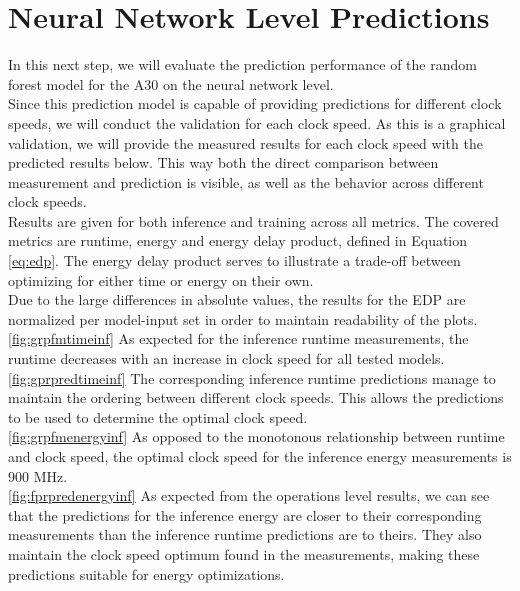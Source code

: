 \FloatBarrier


\section{Neural Network Level Predictions}


In this next step, we will evaluate the prediction performance of the random forest model for the A30 on the neural network level. \\
Since this prediction model is capable of providing predictions for different clock speeds, we will conduct the validation for each clock speed. As this is a graphical validation, we will provide the measured results for each clock speed with the predicted results below. This way both the direct comparison between measurement and prediction is visible, as well as the behavior across different clock speeds. \\
Results are given for both inference and training across all metrics. The covered metrics are runtime, energy and energy delay product, defined in Equation \ref{eq:edp}. The energy delay product serves to illustrate a trade-off between optimizing for either time or energy on their own. \\
Due to the large differences in absolute values, the results for the EDP are normalized per model-input set in order to maintain readability of the plots. \\
\ref{fig:grpfmtimeinf} As expected for the inference runtime measurements, the runtime decreases with an increase in clock speed for all tested models. \\
\ref{fig:gprpredtimeinf} The corresponding inference runtime predictions manage to maintain the ordering between different clock speeds.
This allows the predictions to be used to determine the optimal clock speed. \\
\ref{fig:grpfmenergyinf} As opposed to the monotonous relationship between runtime and clock speed, the optimal clock speed for the inference energy measurements is $900$ MHz. \\
\ref{fig:fprpredenergyinf} As expected from the operations level results, we can see that the predictions for the inference energy are closer to their corresponding measurements than the inference runtime predictions are to theirs. They also maintain the clock speed optimum found in the measurements, making these predictions suitable for energy optimizations. \\
